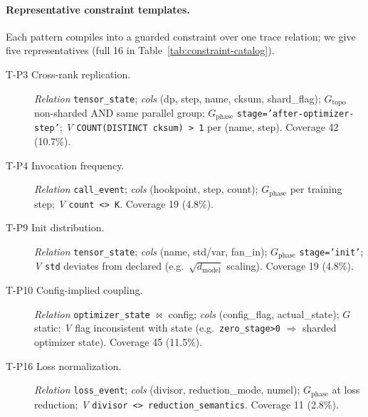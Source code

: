 
\paragraph{Representative constraint templates.}
Each pattern compiles into a guarded constraint over one trace relation; we give five representatives (full 16 in Table~\ref{tab:constraint-catalog}).

\begin{description}
\item[T-P3 Cross-rank replication.] \textit{Relation} \texttt{tensor\_state}; \textit{cols} (dp, step, name, cksum, shard\_flag); \textit{$G_{\text{topo}}$} non-sharded AND same parallel group; \textit{$G_{\text{phase}}$} \texttt{stage='after-optimizer-step'}; \textit{V} \texttt{COUNT(DISTINCT cksum) > 1} per (name, step). Coverage 42 (10.7\%).
\item[T-P4 Invocation frequency.] \textit{Relation} \texttt{call\_event}; \textit{cols} (hookpoint, step, count); \textit{$G_{\text{phase}}$} per training step; \textit{V} \texttt{count <> K}. Coverage 19 (4.8\%).
\item[T-P9 Init distribution.] \textit{Relation} \texttt{tensor\_state}; \textit{cols} (name, std/var, fan\_in); \textit{$G_{\text{phase}}$} \texttt{stage='init'}; \textit{V} \texttt{std} deviates from declared (e.g.\ $\sqrt{d_{\text{model}}}$ scaling). Coverage 19 (4.8\%).
\item[T-P10 Config-implied coupling.] \textit{Relation} \texttt{optimizer\_state} $\bowtie$ config; \textit{cols} (config\_flag, actual\_state); \textit{$G$} static; \textit{V} flag inconsistent with state (e.g.\ \texttt{zero\_stage>0} $\Rightarrow$ sharded optimizer state). Coverage 45 (11.5\%).
\item[T-P16 Loss normalization.] \textit{Relation} \texttt{loss\_event}; \textit{cols} (divisor, reduction\_mode, numel); \textit{$G_{\text{phase}}$} at loss reduction; \textit{V} \texttt{divisor <> reduction\_semantics}. Coverage 11 (2.8\%).
\end{description}

